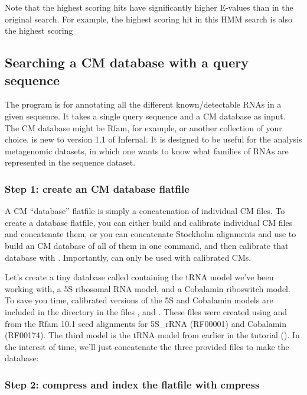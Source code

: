 Note that the highest scoring hits have significantly higher E-values
than in the original search. For example, the highest scoring hit in
this HMM search is also the highest scoring 


\subsection{Searching a CM database with a query sequence}

The  program is for annotating all the different
known/detectable RNAs in a given sequence. It takes a single query
sequence and a CM database as input. The CM database might be Rfam,
for example, or another collection of your choice.  is
new to version 1.1 of Infernal. It is designed to be useful for
the analysis metagenomic datasets, in which one wants to know what
families of RNAs are represented in the sequence dataset.

\subsubsection{Step 1: create an CM database flatfile}

A CM ``database'' flatfile is simply a concatenation of individual CM
files. To create a database flatfile, you can either build and
calibrate individual CM files and concatenate them, or you can
concatenate Stockholm alignments and use  to build an CM
database of all of them in one command, and then calibrate that
database with . Importantly,  can only
be used with calibrated CMs.

Let's create a tiny database called  containing the
tRNA model we've been working with, a 5S ribosomal RNA model, and a
Cobalamin riboswitch model. To save you time, calibrated versions of
the 5S and Cobalamin models are included in the 
directory in the files , and
. These files were created using 
and  from the Rfam 10.1 seed alignments for 5S\_rRNA
(RF00001) and Cobalamin (RF00174). The third model is the tRNA model
from earlier in the tutorial (). In the
interest of time, we'll just concatenate the three provided files to
make the database:


\subsubsection{Step 2: compress and index the flatfile with cmpress}

